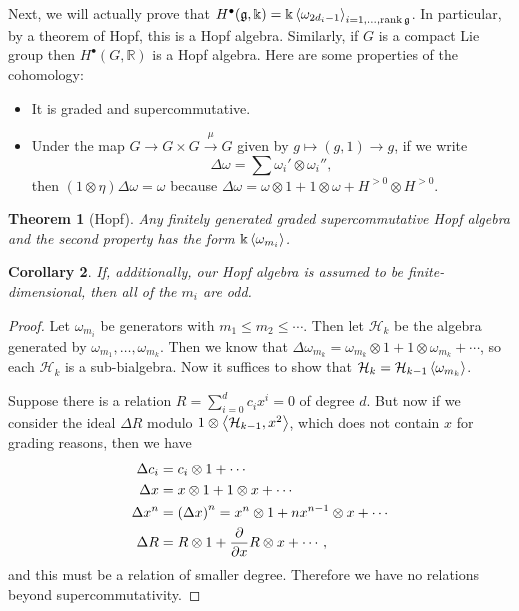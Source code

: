\documentclass[leqno, openany]{memoir}
\newtheorem{thm}{Theorem}[section]
\newtheorem{cor}[thm]{Corollary}
\theoremstyle{definition}
\theoremstyle{remark}
\theoremstyle{plain}
\theoremstyle{definition}
\theoremstyle{remark}
\newcommand{\R}{\mathbb{R}}
\renewcommand{\k}{\Bbbk}
\newcommand{\mf}[1]{\mathfrak{#1}}
\begin{document}
Next, we will actually prove that $H^{\bullet}(\mf{g}, \k) = \k \ev{\omega_{2d_i - 1}}_{i = 1, \ldots, \rank \mf{g}}$. In particular, by a theorem of Hopf, this is a Hopf algebra. Similarly, if $G$ is a compact Lie group then $H^{\bullet}(G, \R)$ is a Hopf algebra. Here are some properties of the cohomology:
\begin{itemize}
    \item It is graded and supercommutative.
    \item Under the map $G \to G \times G \xrightarrow{\mu} G$ given by $g \mapsto (g, 1) \to g$, if we write
        \[ \Delta \omega = \sum \omega_i' \otimes \omega_i'', \]
        then $(1 \otimes \eta) \Delta \omega = \omega$ because $\Delta \omega = \omega \otimes 1 + 1 \otimes \omega + H^{>0} \otimes H^{>0}$.
\end{itemize}

\begin{thm}[Hopf]
    Any finitely generated graded supercommutative Hopf algebra and the second property has the form $\k \ev{\omega_{m_i}}$.
\end{thm}

\begin{cor}
    If, additionally, our Hopf algebra is assumed to be finite-dimensional, then all of the $m_i$ are odd.
\end{cor}

\begin{proof}
    Let $\omega_{m_i}$ be generators with $m_1 \leq m_2 \leq \cdots$. Then let $\mathcal{H}_k$ be the algebra generated by $\omega_{m_1}, \ldots, \omega_{m_k}$. Then we know that $\Delta \omega_{m_k} = \omega_{m_k} \otimes 1 + 1 \otimes \omega_{m_k} + \cdots$, so each $\mathcal{H}_k$ is a sub-bialgebra. Now it suffices to show that $\mathcal{H}_k = \mathcal{H}_{k-1} \ev{\omega_{m_k}}$.

    Suppose there is a relation $R = \sum_{i=0}^d c_i x^i = 0$ of degree $d$. But now if we consider the ideal $\Delta R$ modulo $1 \otimes \ev{\mathcal{H}_{k-1}, x^2}$, which does not contain $x$ for grading reasons, then we have
    \begin{align*}
        \Delta c_i &= c_i \otimes 1 + \cdots \\
        \Delta x &= x \otimes 1 + 1 \otimes x + \cdots \\
        \Delta x^n &= {(\Delta x)}^n = x^n \otimes 1 + nx^{n-1} \otimes x + \cdots \\
        \Delta R &= R \otimes 1 + \pdv{x} R \otimes x + \cdots,
    \end{align*}
    and this must be a relation of smaller degree. Therefore we have no relations beyond supercommutativity.
\end{proof}
\end{document}
